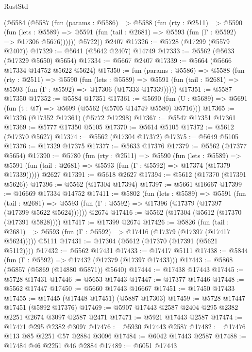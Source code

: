 \begin{lexlean}{RustStd}
\begin{coremodule}
      (@5584
        (@5587
          (fun (params : @5586) =>
          @5588
            (fun (rty : @2511) =>
            @5590
              (fun (lets : @5589) =>
              @5591 (fun (tail : @2681) => @5593 (fun (Γ : @5592) => @17306 @5676))))))
        @5722))
    @2407
@17326 := @5728 (@17299 (@5579 @2407))
@17329 := @5641 (@5642 @2407) @14749
@17333 := @5562 (@5633 (@17329 @5650) @5654)
@17334 := @5667 @2407
@17339 := @5664 (@5666 @17334 @14752 @5622 @5624)
@17350 := fun (params : @5586) =>
  @5588
    (fun (rty : @2511) =>
    @5590
      (fun (lets : @5589) =>
      @5591 (fun (tail : @2681) => @5593 (fun (Γ : @5592) => @17306 (@17333 @17339)))))
@17351 := @5587 @17350
@17352 := @5584 @17351
@17361 := @5690
    (fun (U : @5689) => @5691 (fun (t : @7) => @5699 (@5562 (@5705 @14749 @5580) @5716)))
@17365 := @17326 (@17352 @17361) (@5772 @17298)
@17367 := @5547 @17351 @17361
@17369 := @5777 @17350 @5105
@17370 := @5614 @5105
@17372 := @5612 (@17370 @5627)
@17374 := @5562 (@17304 @17372)
@17375 := @5649 @5105
@17376 := @17329 @17375
@17377 := @5633 @17376
@17379 := @5562 (@17377 @5654)
@17390 := @5780
    (fun (rty : @2511) =>
    @5590
      (fun (lets : @5589) =>
      @5591 (fun (tail : @2681) => @5593 (fun (Γ : @5592) => @17374 (@17379 @17339)))))
    @2627
@17391 := @5618 @2627
@17394 := @5612 (@17370 (@17391 @5626))
@17396 := @5562 (@17304 @17394)
@17397 := @5661 @16667
@17399 := @16669 @17334 @14752
@17411 := @5802
    (fun (lets : @5589) =>
    @5591
      (fun (tail : @2681) =>
      @5593 (fun (Γ : @5592) => @17396 (@17379 (@17397 (@17399 @5622 @5624))))))
    @2674
@17416 := @5562 (@17304 (@5612 (@17370 (@17391 @5828))))
@17417 := @17399 @2674
@17426 := @5826
    (fun (tail : @2681) => @5593 (fun (Γ : @5592) => @17416 (@17379 (@17397 (@17417 @5624)))))
    @5111
@17431 := @17304 (@5612 (@17370 (@17391 (@5621 @5112))))
@17432 := @5562 @17431
@17433 := @17417 @5111
@17438 := @5844 (fun (Γ : @5592) => @17432 (@17379 (@17397 @17433)))
@17443 := @5868 (@5857 (@5869 (@14880 @5871)) @5640)
@17444 := @17438 @17443
@17445 := @5728 @17431
@17446 := @5653 @17443
@17447 := @17377 @17446
@17448 := @5562 @17447
@17450 := @5660 @17443 @16667
@17451 := @17450 @17433
@17455 := @17445 (@17448 @17451) (@5887 @17303)
@17459 := @5728 @17447 @17451 (@5892 @17376)
@17469 := @5907 @17443 @2587 @2404 @295 @2382 @2251 @2674 @3097 @2587 @2471
@17471 := @5921 @17443 @2587
@17474 := @17471 @295 @2382 @3097
@17476 := @5930 @17443 @2587
@17482 := @17476 @113 @85 @2251 @57 @2884 @3096
@17484 := @6042 @17443 @2587
@17488 := @17484 @46 @2251 @46 @2884
@17489 := @6051 @17443

\end{coremodule}
\end{lexlean}
